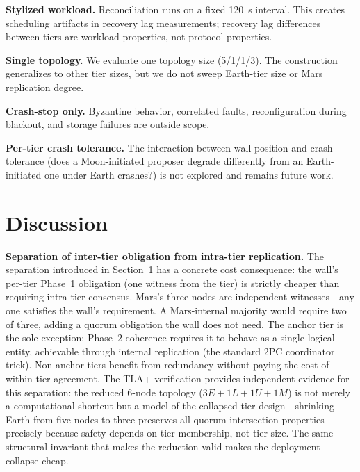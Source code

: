\documentclass[11pt]{article}
\begin{document}
\textbf{Stylized workload.} Reconciliation runs on a fixed 120~s interval. This creates scheduling artifacts in recovery lag measurements; recovery lag differences between tiers are workload properties, not protocol properties.

\textbf{Single topology.} We evaluate one topology size (5/1/1/3). The construction generalizes to other tier sizes, but we do not sweep Earth-tier size or Mars replication degree.

\textbf{Crash-stop only.} Byzantine behavior, correlated faults, reconfiguration during blackout, and storage failures are outside scope.

\textbf{Per-tier crash tolerance.} The interaction between wall position and crash tolerance (does a Moon-initiated proposer degrade differently from an Earth-initiated one under Earth crashes?) is not explored and remains future work.


\section{Discussion}
\label{sec:leadership}

\textbf{Separation of inter-tier obligation from intra-tier replication.} The separation introduced in Section~1 has a concrete cost consequence: the wall's per-tier Phase~1 obligation (one witness from the tier) is strictly cheaper than requiring intra-tier consensus. Mars's three nodes are independent witnesses---any one satisfies the wall's requirement. A Mars-internal majority would require two of three, adding a quorum obligation the wall does not need. The anchor tier is the sole exception: Phase~2 coherence requires it to behave as a single logical entity, achievable through internal replication (the standard 2PC coordinator trick). Non-anchor tiers benefit from redundancy without paying the cost of within-tier agreement. The TLA+ verification provides independent evidence for this separation: the reduced 6-node topology ($3E + 1L + 1U + 1M$) is not merely a computational shortcut but a model of the collapsed-tier design---shrinking Earth from five nodes to three preserves all quorum intersection properties precisely because safety depends on tier membership, not tier size. The same structural invariant that makes the reduction valid makes the deployment collapse cheap.
\end{document}
